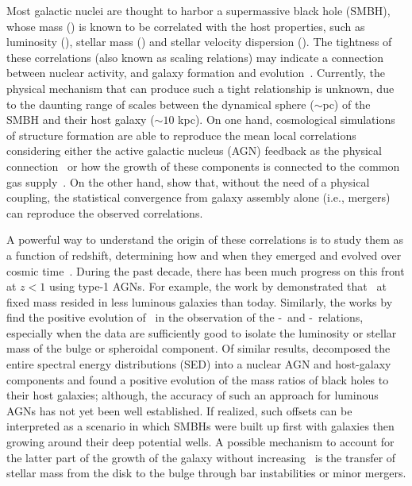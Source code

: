 \documentclass[apj]{emulateapj}
\begin{document}
Most galactic nuclei are thought to harbor a supermassive black hole (SMBH), whose mass (\mbh) is known to be correlated with the host properties, such as luminosity (\lhost), stellar mass (\smass) and stellar velocity dispersion (\sigstar). The tightness of these correlations (also known as scaling relations) may indicate a connection between nuclear activity, and galaxy formation and evolution~\citep[e.g.,][]{Mag++98, F+M00, M+H03, Gul++09,Beifi2012, H+R04, Geb++01b, Gra++2011}.
Currently, the physical mechanism that can produce such a tight relationship is unknown, due to the daunting range of scales between the dynamical sphere ($\sim$pc) of the SMBH and their host galaxy ($\sim10$ kpc). On one hand, cosmological simulations of structure formation are able to reproduce the mean local correlations considering either the active galactic nucleus (AGN) feedback as the physical connection~\citep{Springel2005, Hopkins2008, Matteo2008, DeG++15} or how the growth of these components is connected to the common gas supply~\citep{Cen2015, Menci2016}.
On the other hand, \citet{Peng2007, Jahnke2011, Hirschmann2010} show that, without the need of a physical coupling, the statistical convergence from galaxy assembly alone (i.e., mergers) can reproduce the observed correlations.

A powerful way to understand the origin of these correlations is to study them as a function of redshift, determining how and when they emerged and evolved over cosmic time~\citep[e.g.,][]{TMB04,Sal++06,Woo++06, Jah++09,SS13,Sun2015}. During the past decade, there has been much progress on this front at $z<1$ using type-1 AGNs. For example, the work by \citet{Park15, Tre++07, Pen++06qsob} demonstrated that \mbh\ at fixed mass resided in less luminous galaxies than today. Similarly, the works by \citet{Bennert11, Woo++08} find the positive evolution of \mbh\ in the observation of the \mbh-\smass\ and \mbh-\sigstar\ relations, especially when the data are sufficiently good to isolate the luminosity or stellar mass of the bulge or spheroidal component. Of similar results, \citet{Merloni2010} decomposed the entire spectral energy distributions (SED) into a nuclear AGN and host-galaxy components and found a positive evolution of the mass ratios of black holes to their host galaxies; although, the accuracy of such an approach for luminous AGNs has not yet been well established. If realized, such offsets can be interpreted as a scenario in which SMBHs were built up first with galaxies then growing around their deep potential wells.  A possible mechanism to account for the latter part of the growth of the galaxy without increasing \mbh\ is the transfer of stellar mass from the disk to the bulge \citep{Bennert++2011} through bar instabilities or minor mergers. 
\end{document}
